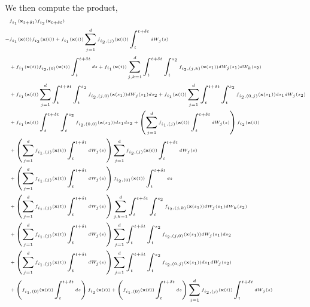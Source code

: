 %
We then compute the product,
%
\begin{equation}
\tiny
\begin{aligned}
&f_{i_1}(\mathbf{x}_{t + \delta t}) f_{i_2}(\mathbf{x}_{t + \delta t}) \\
=&
f_{i_1}(\mathbf{x}(t)) f_{i_2}(\mathbf{x}(t))
+  f_{i_1}(\mathbf{x}(t)) \sum_{j=1}^\lowdim f_{{i_2},(j)}(\mathbf{x}(t)) \int_t^{t + \delta t} dW_j(s) \\
&+  f_{i_1}(\mathbf{x}(t)) f_{{i_2},(0)}(\mathbf{x}(t)) \int_t^{t + \delta t} ds
+ f_{i_1}(\mathbf{x}(t)) \sum_{j, k=1}^\lowdim \int_t^{t+\delta t} \int_t^{s_2} f_{{i_2}, (j,k)}(\mathbf{x}(s_1)) dW_j(s_1) dW_k(s_2) \\
&+ f_{i_1}(\mathbf{x}(t)) \sum_{j=1}^\lowdim \int_t^{t+\delta t} \int_t^{s_2} f_{{i_2}, (j,0)}(\mathbf{x}(s_1)) dW_j(s_1) ds_2
+ f_{i_1}(\mathbf{x}(t)) \sum_{j=1}^\lowdim \int_t^{t+\delta t} \int_t^{s_2} f_{{i_2}, (0,j)}(\mathbf{x}(s_1)) ds_1 dW_j(s_2) \\
&+ f_{i_1}(\mathbf{x}(t)) \int_t^{t+\delta t} \int_t^{s_2} f_{{i_2}, (0,0)}(\mathbf{x}(s_1)) ds_1 ds_2
+ \left( \sum_{j=1}^\lowdim f_{{i_1},(j)}(\mathbf{x}(t)) \int_t^{t + \delta t} dW_j(s) \right) f_{i_2}(\mathbf{x}(t)) \\
&+ \left( \sum_{j=1}^\lowdim f_{{i_1},(j)}(\mathbf{x}(t)) \int_t^{t + \delta t} dW_j(s) \right) \sum_{j=1}^\lowdim f_{{i_2},(j)}(\mathbf{x}(t)) \int_t^{t + \delta t} dW_j(s) \\
& +  \left(\sum_{j=1}^\lowdim f_{{i_1},(j)}(\mathbf{x}(t)) \int_t^{t + \delta t} dW_j(s) \right)f_{{i_2},(0)}(\mathbf{x}(t)) \int_t^{t + \delta t} ds \\
&+ \left(\sum_{j=1}^\lowdim f_{{i_1},(j)}(\mathbf{x}(t)) \int_t^{t + \delta t} dW_j(s) \right) \sum_{j, k=1}^\lowdim \int_t^{t+\delta t} \int_t^{s_2} f_{{i_2},(j,k)}(\mathbf{x}(s_1)) dW_j(s_1) dW_k(s_2) \\
&+ \left(\sum_{j=1}^\lowdim f_{{i_1},(j)}(\mathbf{x}(t)) \int_t^{t + \delta t} dW_j(s) \right)\sum_{j=1}^\lowdim \int_t^{t+\delta t} \int_t^{s_2} f_{{i_2},(j,0)}(\mathbf{x}(s_1)) dW_j(s_1) ds_2 \\
&+ \left(\sum_{j=1}^\lowdim f_{{i_1},(j)}(\mathbf{x}(t)) \int_t^{t + \delta t} dW_j(s) \right)\sum_{j=1}^\lowdim \int_t^{t+\delta t} \int_t^{s_2} f_{{i_2},(0,j)}(\mathbf{x}(s_1)) ds_1 dW_j(s_2) \\
&+\left( f_{{i_1},(0)}(\mathbf{x}(t)) \int_t^{t + \delta t} ds \right) f_{i_2}(\mathbf{x}(t))
+  \left( f_{{i_1},(0)}(\mathbf{x}(t)) \int_t^{t + \delta t} ds \right)\sum_{j=1}^\lowdim f_{{i_2},(j)}(\mathbf{x}(t)) \int_t^{t + \delta t} dW_j(s) \\

\end{aligned}
\end{equation}
